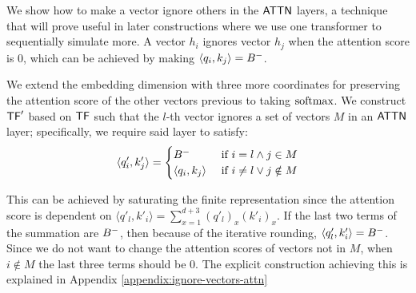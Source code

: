 We show how to make a vector ignore others in the $\mathsf{ATTN}$ layers, a technique that will prove useful in later constructions where we use one transformer to sequentially simulate more.
A vector $h_i$ ignores vector $h_j$ when the attention score is $0$, which can be achieved by making $\langle q_i, k_j\rangle = B^{-}$.

\bigskip

We extend the embedding dimension with three more coordinates for preserving the attention score of the other vectors previous to taking $\mathrm{softmax}$. 
We construct $\mathsf{TF}'$ based on $\mathsf{TF}$ such that the $l$-th vector ignores a set of vectors $M$ in an $\mathsf{ATTN}$ layer; specifically, we require said layer to satisfy: 
\[
    \langle q_i', k_j' \rangle = \begin{cases}
        B^{-}                  & \text{ if } i = l \land j \in M \\
        \langle q_i, k_j \rangle & \text{ if } i \neq l \lor j \notin M
    \end{cases}
\]
    
This can be achieved by saturating the finite representation since the attention score is dependent on $\langle q'_l, k'_i \rangle = \sum_{x=1}^{d+3} (q'_l)_x (k'_i)_x$.
If the last two terms of the summation are $B^{-}$, then because of the iterative rounding, $\langle q'_l, k'_i \rangle = B^{-}$.
Since we do not want to change the attention scores of vectors not in $M$, when $i \notin M$ the last three terms should be $0$.
The explicit construction achieving this is explained in Appendix \ref{appendix:ignore-vectors-attn}

